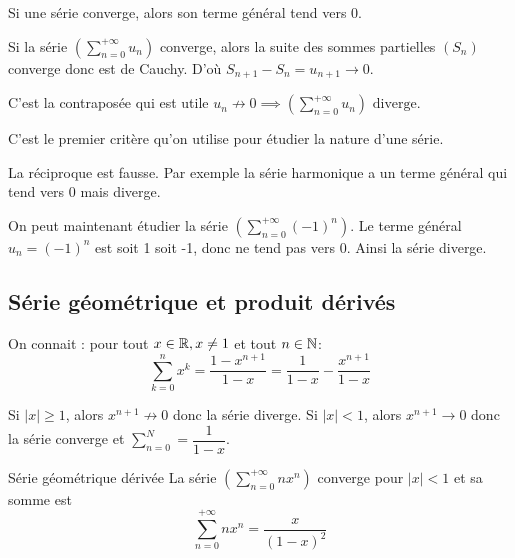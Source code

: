 \documentclass[a4paper, 12pt]{article}
\begin{document}
\begin{theoreme}{}{}
    Si une série converge, alors son terme général tend vers 0.
\end{theoreme}

\begin{demonstration}
    Si la série $\left( \sum\limits_{n=0}^{+\infty} u_n \right)$ converge,
    alors la suite des sommes partielles $(S_n)$ converge donc est de Cauchy.\n
    D'où $S_{n+1} - S_n = u_{n+1} \rightarrow 0$.
\end{demonstration}

\begin{methode}
    C'est la contraposée qui est utile\n
    $u_n \not\rightarrow 0 \implies \left(\sum\limits_{n=0}^{+\infty} u_n\right) \text{ diverge}$.

    C'est le premier critère qu'on utilise pour étudier la nature d'une série.
\end{methode}

\begin{remarque}
    La réciproque est fausse.\n
    Par exemple la série harmonique a un terme général qui tend vers 0 mais diverge.
\end{remarque}

\begin{exemple}
    On peut maintenant étudier la série $(\sum\limits_{n=0}^{+\infty}(-1)^n)$.\n
    Le terme général $u_n = (-1)^n$ est soit 1 soit -1, donc ne tend pas vers 0.\n
    Ainsi la série diverge.
\end{exemple}

\subsection{Série géométrique et produit dérivés}

On connait : pour tout $x \in \mathbb{R}, x \neq 1$ et tout $n \in \mathbb{N}$:
$$
\sum\limits_{k=0}^{n} x^k = \dfrac{1 - x^{n+1}}{1 - x} = \dfrac{1}{1 - x} - \dfrac{x^{n+1}}{1 - x}
$$

Si $|x| \geq 1$, alors $x^{n+1} \not\rightarrow 0$ donc la série diverge.\n
Si $|x| \lt 1$, alors $x^{n+1} \rightarrow 0$ donc la série converge et $\sum\limits_{n=0}^{N} = \dfrac{1}{1 - x}$.

\begin{proposition}{Série géométrique dérivée}{}
    La série $(\sum\limits_{n=0}^{+\infty} nx^n)$ converge pour $|x| \lt 1$ et sa somme est
    $$
    \sum\limits_{n=0}^{+\infty}nx^n = \dfrac{x}{(1 - x)^2}
    $$
\end{proposition}
\end{document}
